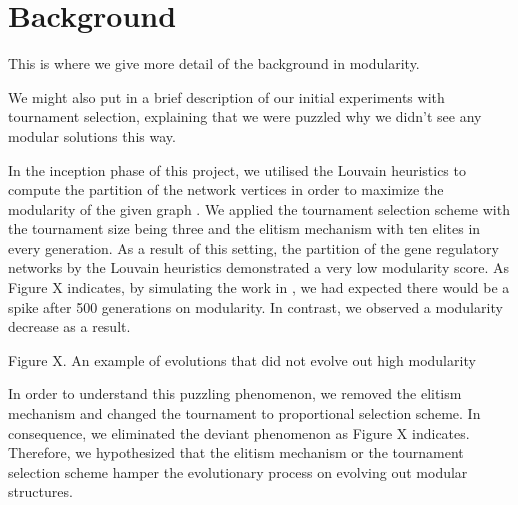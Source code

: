 \section{Background}
This is where we give more detail of the background in modularity.

We might also put in a brief description of our initial experiments with tournament selection, explaining that we were puzzled why we didn't see any modular solutions this way.

In the inception phase of this project, we utilised the Louvain heuristics to compute the partition of the network vertices in order to maximize the modularity of the given graph \cite{blondel2008louvain}. We applied the tournament selection scheme with the tournament size being three and the elitism mechanism with ten elites in every generation. As a result of this setting, the partition of the gene regulatory networks by the Louvain heuristics demonstrated a very low modularity score. As Figure X indicates, by simulating the work in \cite{espinosa2010specialization}, we had expected there would be a spike after 500 generations on modularity. In contrast, we observed a modularity decrease as a result. 

Figure X. An example of evolutions that did not evolve out high modularity


In order to understand this puzzling phenomenon, we removed the elitism mechanism and changed the tournament to proportional selection scheme. In consequence, we eliminated the deviant phenomenon as Figure X indicates. Therefore, we hypothesized that the elitism mechanism or the tournament selection scheme hamper the evolutionary process on evolving out modular structures. 

